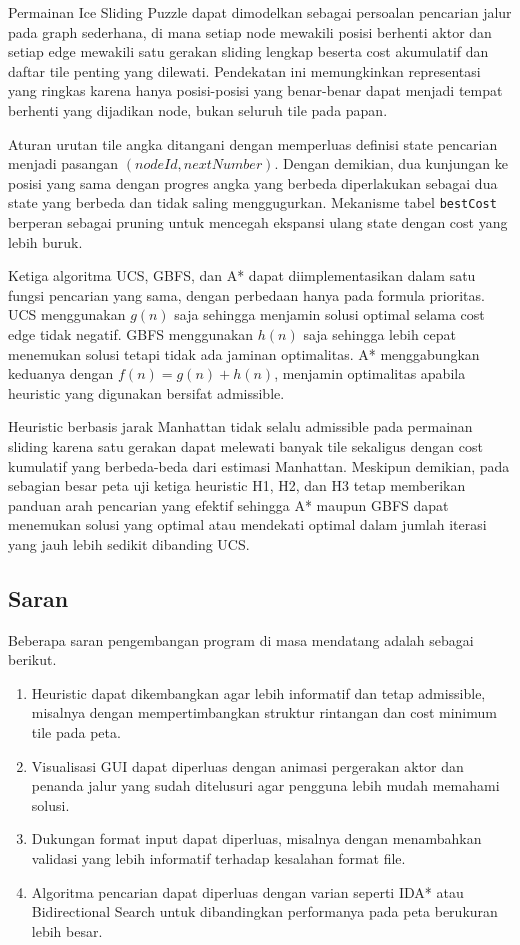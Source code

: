 \documentclass[a4paper,11pt]{article}
\begin{document}
Permainan Ice Sliding Puzzle dapat dimodelkan sebagai persoalan pencarian jalur pada graph sederhana, di mana setiap node mewakili posisi berhenti aktor dan setiap edge mewakili satu gerakan sliding lengkap beserta cost akumulatif dan daftar tile penting yang dilewati. Pendekatan ini memungkinkan representasi yang ringkas karena hanya posisi-posisi yang benar-benar dapat menjadi tempat berhenti yang dijadikan node, bukan seluruh tile pada papan.

Aturan urutan tile angka ditangani dengan memperluas definisi state pencarian menjadi pasangan $(nodeId, nextNumber)$. Dengan demikian, dua kunjungan ke posisi yang sama dengan progres angka yang berbeda diperlakukan sebagai dua state yang berbeda dan tidak saling menggugurkan. Mekanisme tabel \texttt{bestCost} berperan sebagai pruning untuk mencegah ekspansi ulang state dengan cost yang lebih buruk.

Ketiga algoritma UCS, GBFS, dan A* dapat diimplementasikan dalam satu fungsi pencarian yang sama, dengan perbedaan hanya pada formula prioritas. UCS menggunakan $g(n)$ saja sehingga menjamin solusi optimal selama cost edge tidak negatif. GBFS menggunakan $h(n)$ saja sehingga lebih cepat menemukan solusi tetapi tidak ada jaminan optimalitas. A* menggabungkan keduanya dengan $f(n) = g(n) + h(n)$, menjamin optimalitas apabila heuristic yang digunakan bersifat admissible.

Heuristic berbasis jarak Manhattan tidak selalu admissible pada permainan sliding karena satu gerakan dapat melewati banyak tile sekaligus dengan cost kumulatif yang berbeda-beda dari estimasi Manhattan. Meskipun demikian, pada sebagian besar peta uji ketiga heuristic H1, H2, dan H3 tetap memberikan panduan arah pencarian yang efektif sehingga A* maupun GBFS dapat menemukan solusi yang optimal atau mendekati optimal dalam jumlah iterasi yang jauh lebih sedikit dibanding UCS.

\subsection{Saran}
Beberapa saran pengembangan program di masa mendatang adalah sebagai berikut.
\begin{enumerate}
    \item Heuristic dapat dikembangkan agar lebih informatif dan tetap admissible, misalnya dengan mempertimbangkan struktur rintangan dan cost minimum tile pada peta.
    \item Visualisasi GUI dapat diperluas dengan animasi pergerakan aktor dan penanda jalur yang sudah ditelusuri agar pengguna lebih mudah memahami solusi.
    \item Dukungan format input dapat diperluas, misalnya dengan menambahkan validasi yang lebih informatif terhadap kesalahan format file.
    \item Algoritma pencarian dapat diperluas dengan varian seperti IDA* atau Bidirectional Search untuk dibandingkan performanya pada peta berukuran lebih besar.
\end{enumerate}
\end{document}

